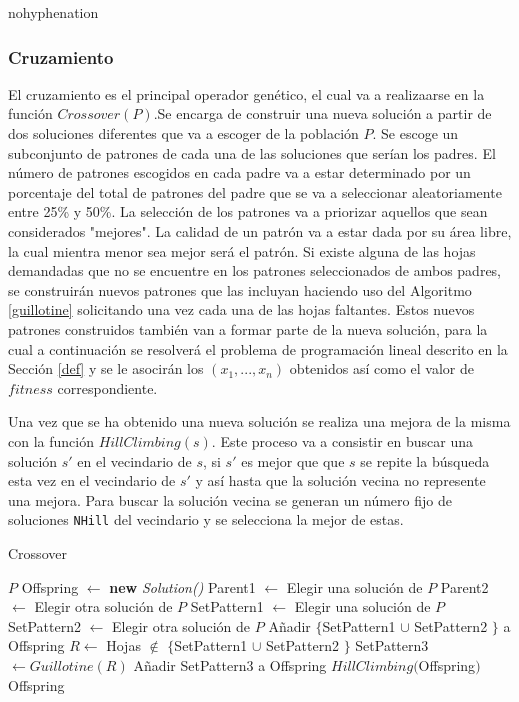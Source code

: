 \documentclass[a4paper,10pt,twocolumn]{article}
\begin{document}
\begin{hyphenrules}{nohyphenation}
\begin{itemize}
	
\end{itemize}


\subsubsection{Cruzamiento}\label{cruzamiento}
El cruzamiento es el principal operador genético, el cual va a realizaarse en la función $Crossover(P)$.Se encarga de construir una nueva solución a partir de dos soluciones diferentes que va a escoger de la población $P$. Se escoge un subconjunto de patrones de cada una de las soluciones que serían los padres. El número de patrones escogidos en cada padre va a estar determinado  por un porcentaje del total de patrones del padre que se va a seleccionar aleatoriamente entre 25\% y 50\%. La selección de los patrones va a priorizar aquellos que sean considerados "mejores". La calidad de un patrón va a estar dada por su área libre, la cual mientra menor sea mejor será el patrón. Si existe alguna de las hojas demandadas que no se encuentre en los patrones seleccionados de ambos padres, se construirán nuevos patrones que las incluyan haciendo uso del Algoritmo \ref{guillotine} solicitando una vez cada una de las hojas faltantes. Estos nuevos patrones construidos también van a formar parte de la nueva solución, para la cual a continuación se resolverá el problema de programación lineal descrito en  la Sección \ref{def} y se le asocirán los $(x_1,...,x_n)$ obtenidos así como el valor de $fitness$ correspondiente.

Una vez que se ha obtenido una nueva solución se realiza una mejora de la misma con la función $HillClimbing(s)$. Este proceso va a consistir en buscar una solución $s'$ en el vecindario de $s$, si $s'$ es mejor que que $s$ se repite la búsqueda esta vez en el vecindario de $s'$ y así hasta que la solución vecina no represente una mejora. Para buscar la solución vecina se generan un número fijo de soluciones \texttt{NHill} del vecindario y se selecciona la mejor de estas.     

\algrenewcommand{}
\algrenewcommand{}
\begin{algorithm}
	\caption{Crossover}\label{crossover}
	\begin{algorithmic}[1]
		\Require $P$
		\State Offspring $\gets$ \textbf{new} \textit{Solution()}
		\State Parent1 $\gets $ Elegir una solución de $P$
		\State Parent2 $\gets $ Elegir otra solución de $P$
		\State SetPattern1 $\gets $ Elegir una solución de $P$
		\State SetPattern2 $\gets $ Elegir otra solución de $P$
		\State Añadir $\{$SetPattern1 $\cup$ SetPattern2 $\}$ a Offspring
		\State $R \gets $ Hojas $\notin $ $\{$SetPattern1 $\cup$ SetPattern2
		$\}$
		\State SetPattern3 $\gets Guillotine(R)$ 
		\State Añadir SetPattern3 a Offspring
		\State $ HillClimbing($Offspring$)$\\
		\Return Offspring 
	\end{algorithmic}
\end{algorithm}




\end{hyphenrules}
\end{document}
